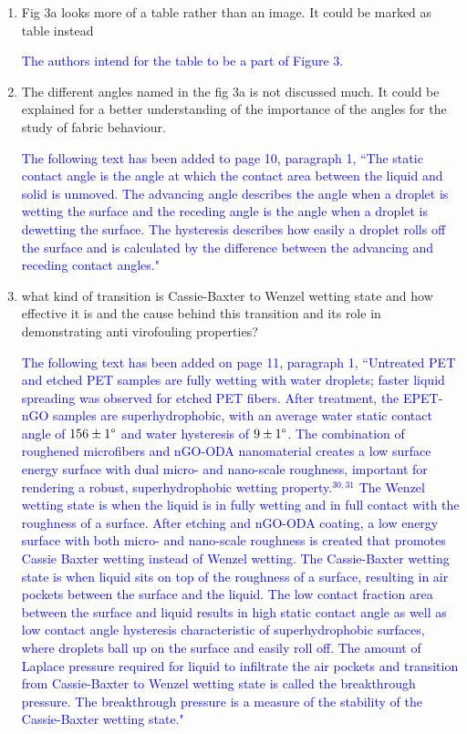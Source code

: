 \documentclass[12pt]{letter}
\newcommand{\blue}[1]{\textcolor{blue}{#1}} %
\begin{document}
\begin{enumerate}
\item    Fig 3a looks more of a table rather than an image. It could be marked as table instead

\blue{The authors intend for the table to be a part of Figure 3. }

\item     The different angles named in the fig 3a is not discussed much. It could be explained for a better understanding of the importance of the angles for the study of fabric behaviour.

\blue{ The following text has been added to page 10, paragraph 1, ``The static contact angle is the angle at which the contact area between the liquid and solid is unmoved. The advancing angle describes the angle when a droplet is wetting the surface and the receding angle is the angle when a droplet is dewetting the surface. The hysteresis describes how easily a droplet rolls off the surface and is calculated by the difference between the advancing and receding contact angles."}

\item    what kind of transition is Cassie-Baxter to Wenzel wetting state and how effective it is and the cause behind this transition and its role in demonstrating anti virofouling properties?

\blue{The following text has been added on page 11, paragraph 1, 
``Untreated PET and etched PET samples are fully wetting with water droplets; faster liquid spreading was observed for etched PET fibers.
After treatment, the 
EPET-nGO samples are superhydrophobic, with an average water static contact angle of $156 \pm 1\degree$ and water hysteresis of $9 \pm 1\degree$.
The combination of roughened microfibers and nGO-ODA nanomaterial creates a low surface energy surface with dual micro- and nano-scale roughness, important for rendering a robust, superhydrophobic wetting property.$^{30,31}$
The Wenzel wetting state is when the liquid is in fully wetting and in full contact with the roughness of a surface. 
After etching and nGO-ODA coating, a low energy surface with both micro- and nano-scale roughness is created that promotes Cassie Baxter wetting instead of Wenzel wetting.  
The Cassie-Baxter wetting state is when liquid sits on top of the roughness of a surface, resulting in air pockets between the surface and the liquid. 
The low contact fraction area between the surface and liquid results in high static contact angle as well as low contact angle hysteresis characteristic of superhydrophobic surfaces, where droplets ball up on the surface and easily roll off.  
The amount of Laplace pressure required for liquid to infiltrate the air pockets and transition from Cassie-Baxter  to Wenzel wetting state is called the breakthrough pressure. The breakthrough pressure is a measure of the stability of the Cassie-Baxter wetting state."}




\end{enumerate}
\end{document}
